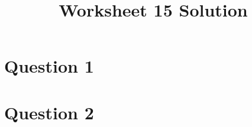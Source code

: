 \documentclass[12pt]{article}
\begin{document}
\title{Worksheet 15 Solution}
\maketitle

\section*{Question 1}

\section*{Question 2}
\end{document}
